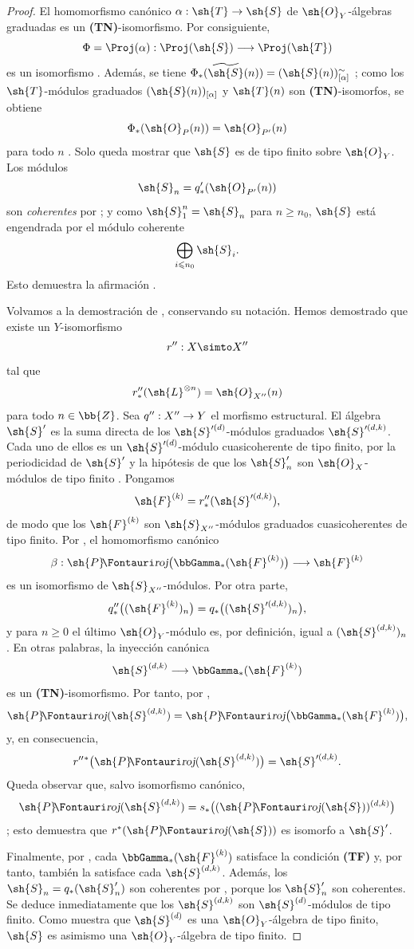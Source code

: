 \documentclass[oneside]{amsart}
\makeatletter
\renewcommand{\leq}{\leqslant}
\renewcommand{\geq}{\geqslant}
\newcommand{\ega@arrow}[2]{\mathchoice{#1}{#2}{#2}{#2}}
\renewcommand{\to}{\ega@arrow{\longrightarrow}{\rightarrow}}
\newcommand*{\ega@sheafop}[3]{\sh{#1}#2\textup{\kern-2.2pt{\Fontauri\slshape #3}}}
\newcommand*{\shProj}{\ega@sheafop{P}{}{roj}}
\let\EGAOriginalLabel\label
\renewcommand{\label}[1]{\phantomsection\EGAOriginalLabel{#1}}
\makeatother
\begin{document}
\begin{proof}
El homomorfismo canónico $\alpha:\sh{T}\to\sh{S}$ de $\sh{O}_Y$-álgebras graduadas es un \textbf{(TN)}-isomorfismo.
Por consiguiente,
\label{III.2.3.5.1}
\[
  \Phi=\Proj(\alpha):\Proj(\sh{S})\longrightarrow\Proj(\sh{T})
\]
es un isomorfismo .
Además, se tiene $\Phi_*(\widetilde{\sh{S}}(n))=(\sh{S}(n))^\sim_{[\alpha]}$ ; como los $\sh{T}$-módulos graduados $(\sh{S}(n))_{[\alpha]}$ y $\sh{T}(n)$ son \textbf{(TN)}-isomorfos, se obtiene
\[
  \Phi_*(\sh{O}_P(n))=\sh{O}_{P'}(n)
\]
para todo $n$ .
Solo queda mostrar que $\sh{S}$ es de tipo finito sobre $\sh{O}_Y$.
Los módulos
\[
  \sh{S}_n=q'_*(\sh{O}_{P'}(n))
\]
son \emph{coherentes} por ; y como $\sh{S}_1^n=\sh{S}_n$ para $n\geq n_0$, $\sh{S}$ está engendrada por el módulo coherente
\[
  \bigoplus_{i\leq n_0}\sh{S}_i.
\]
Esto demuestra la afirmación .

Volvamos a la demostración de , conservando su notación.
Hemos demostrado que existe un $Y$-isomorfismo
\[
  r'':X\simto X''
\]
tal que
\[
  r''_*(\sh{L}^{\otimes n})=\sh{O}_{X''}(n)
\]
para todo $n\in\bb{Z}$.
Sea $q'':X''\to Y$ el morfismo estructural.
El álgebra $\sh{S}'$ es la suma directa de los $\sh{S}'^{(d)}$-módulos graduados $\sh{S}'^{(d,k)}$.
Cada uno de ellos es un $\sh{S}'^{(d)}$-módulo cuasicoherente de tipo finito, por la periodicidad de $\sh{S}'$ y la hipótesis de que los $\sh{S}'_n$ son $\sh{O}_X$-módulos de tipo finito .
Pongamos
\[
  \sh{F}^{(k)}=r''_*(\sh{S}'^{(d,k)}),
\]
de modo que los $\sh{F}^{(k)}$ son $\sh{S}_{X''}$-módulos graduados cuasicoherentes de tipo finito.
Por , el homomorfismo canónico
\[
  \beta:\shProj\bigl(\bbGamma_*(\sh{F}^{(k)})\bigr)
  \longrightarrow\sh{F}^{(k)}
\]
es un isomorfismo de $\sh{S}_{X''}$-módulos.
Por otra parte,
\[
  q''_*\bigl((\sh{F}^{(k)})_n\bigr)
  =q_*\bigl((\sh{S}'^{(d,k)})_n\bigr),
\]
y para $n\geq0$ el último $\sh{O}_Y$-módulo es, por definición, igual a $(\sh{S}^{(d,k)})_n$.
En otras palabras, la inyección canónica
\[
  \sh{S}^{(d,k)}
  \longrightarrow\bbGamma_*(\sh{F}^{(k)})
\]
es un \textbf{(TN)}-isomorfismo.
Por tanto, por ,
\[
  \shProj(\sh{S}^{(d,k)})
  =\shProj\bigl(\bbGamma_*(\sh{F}^{(k)})\bigr),
\]
y, en consecuencia,
\[
  r''{}^*\bigl(\shProj(\sh{S}^{(d,k)})\bigr)
  =\sh{S}'^{(d,k)}.
\]
Queda observar que, salvo isomorfismo canónico,
\[
  \shProj(\sh{S}^{(d,k)})
  =s_*\bigl((\shProj(\sh{S}))^{(d,k)}\bigr)
\]
; esto demuestra que $r^*(\shProj(\sh{S}))$ es isomorfo a $\sh{S}'$.

Finalmente, por , cada $\bbGamma_*(\sh{F}^{(k)})$ satisface la condición \textbf{(TF)} y, por tanto, también la satisface cada $\sh{S}^{(d,k)}$.
Además, los $\sh{S}_n=q_*(\sh{S}'_n)$ son coherentes por , porque los $\sh{S}'_n$ son coherentes.
Se deduce inmediatamente que los $\sh{S}^{(d,k)}$ son $\sh{S}^{(d)}$-módulos de tipo finito.
Como  muestra que $\sh{S}^{(d)}$ es una $\sh{O}_Y$-álgebra de tipo finito, $\sh{S}$ es asimismo una $\sh{O}_Y$-álgebra de tipo finito.
\end{proof}
\end{document}
